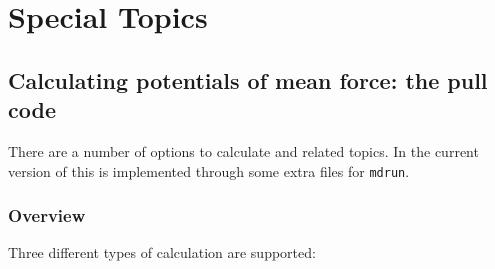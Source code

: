 %
% 
% 
% 
% 
% 
% 
% 
% 
%

\chapter{Special Topics}
\label{ch:special}

\section{Calculating potentials of mean force: the pull code}
\label{sec:pull}
There are a number of options to calculate 
and related topics. In the current version of {\gromacs} this is
implemented through some extra files for {\tt mdrun}. 

\subsection{Overview}
Three different types of calculation are supported:

